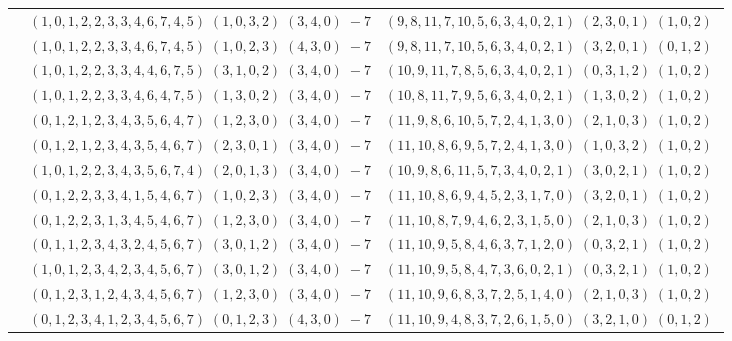 \documentclass[11pt]{article}
\begin{document}
\begin{longtable}[l]{|c|c|c|}
 \cline{2-3} 
 & $(1 ,0 ,1 ,2 ,2 ,3 ,3 ,4 ,6 ,7 ,4 ,5) \;(1 ,0 ,3 ,2) \;(3 ,4 ,0) \;-7$ & $(9 ,8 ,11 ,7 ,10 ,5 ,6 ,3 ,4 ,0 ,2 ,1) \;(2 ,3 ,0 ,1) \;(1 ,0 ,2) \;$\\ 
 \cline{2-3} 
 & $(1 ,0 ,1 ,2 ,2 ,3 ,3 ,4 ,6 ,7 ,4 ,5) \;(1 ,0 ,2 ,3) \;(4 ,3 ,0) \;-7$ & $(9 ,8 ,11 ,7 ,10 ,5 ,6 ,3 ,4 ,0 ,2 ,1) \;(3 ,2 ,0 ,1) \;(0 ,1 ,2) \;$\\ 
 \cline{2-3} 
 & $(1 ,0 ,1 ,2 ,2 ,3 ,3 ,4 ,4 ,6 ,7 ,5) \;(3 ,1 ,0 ,2) \;(3 ,4 ,0) \;-7$ & $(10 ,9 ,11 ,7 ,8 ,5 ,6 ,3 ,4 ,0 ,2 ,1) \;(0 ,3 ,1 ,2) \;(1 ,0 ,2) \;$\\ 
 \cline{2-3} 
 & $(1 ,0 ,1 ,2 ,2 ,3 ,3 ,4 ,6 ,4 ,7 ,5) \;(1 ,3 ,0 ,2) \;(3 ,4 ,0) \;-7$ & $(10 ,8 ,11 ,7 ,9 ,5 ,6 ,3 ,4 ,0 ,2 ,1) \;(1 ,3 ,0 ,2) \;(1 ,0 ,2) \;$\\ 
 \cline{2-3} 
 & $(0 ,1 ,2 ,1 ,2 ,3 ,4 ,3 ,5 ,6 ,4 ,7) \;(1 ,2 ,3 ,0) \;(3 ,4 ,0) \;-7$ & $(11 ,9 ,8 ,6 ,10 ,5 ,7 ,2 ,4 ,1 ,3 ,0) \;(2 ,1 ,0 ,3) \;(1 ,0 ,2) \;$\\ 
 \cline{2-3} 
 & $(0 ,1 ,2 ,1 ,2 ,3 ,4 ,3 ,5 ,4 ,6 ,7) \;(2 ,3 ,0 ,1) \;(3 ,4 ,0) \;-7$ & $(11 ,10 ,8 ,6 ,9 ,5 ,7 ,2 ,4 ,1 ,3 ,0) \;(1 ,0 ,3 ,2) \;(1 ,0 ,2) \;$\\ 
 \cline{2-3} 
 & $(1 ,0 ,1 ,2 ,2 ,3 ,4 ,3 ,5 ,6 ,7 ,4) \;(2 ,0 ,1 ,3) \;(3 ,4 ,0) \;-7$ & $(10 ,9 ,8 ,6 ,11 ,5 ,7 ,3 ,4 ,0 ,2 ,1) \;(3 ,0 ,2 ,1) \;(1 ,0 ,2) \;$\\ 
 \cline{2-3} 
 & $(0 ,1 ,2 ,2 ,3 ,3 ,4 ,1 ,5 ,4 ,6 ,7) \;(1 ,0 ,2 ,3) \;(3 ,4 ,0) \;-7$ & $(11 ,10 ,8 ,6 ,9 ,4 ,5 ,2 ,3 ,1 ,7 ,0) \;(3 ,2 ,0 ,1) \;(1 ,0 ,2) \;$\\ 
 \cline{2-3} 
 & $(0 ,1 ,2 ,2 ,3 ,1 ,3 ,4 ,5 ,4 ,6 ,7) \;(1 ,2 ,3 ,0) \;(3 ,4 ,0) \;-7$ & $(11 ,10 ,8 ,7 ,9 ,4 ,6 ,2 ,3 ,1 ,5 ,0) \;(2 ,1 ,0 ,3) \;(1 ,0 ,2) \;$\\ 
 \cline{2-3} 
 & $(0 ,1 ,1 ,2 ,3 ,4 ,3 ,2 ,4 ,5 ,6 ,7) \;(3 ,0 ,1 ,2) \;(3 ,4 ,0) \;-7$ & $(11 ,10 ,9 ,5 ,8 ,4 ,6 ,3 ,7 ,1 ,2 ,0) \;(0 ,3 ,2 ,1) \;(1 ,0 ,2) \;$\\ 
 \cline{2-3} 
 & $(1 ,0 ,1 ,2 ,3 ,4 ,2 ,3 ,4 ,5 ,6 ,7) \;(3 ,0 ,1 ,2) \;(3 ,4 ,0) \;-7$ & $(11 ,10 ,9 ,5 ,8 ,4 ,7 ,3 ,6 ,0 ,2 ,1) \;(0 ,3 ,2 ,1) \;(1 ,0 ,2) \;$\\ 
 \cline{2-3} 
 & $(0 ,1 ,2 ,3 ,1 ,2 ,4 ,3 ,4 ,5 ,6 ,7) \;(1 ,2 ,3 ,0) \;(3 ,4 ,0) \;-7$ & $(11 ,10 ,9 ,6 ,8 ,3 ,7 ,2 ,5 ,1 ,4 ,0) \;(2 ,1 ,0 ,3) \;(1 ,0 ,2) \;$\\ 
 \cline{2-3} 
 & $(0 ,1 ,2 ,3 ,4 ,1 ,2 ,3 ,4 ,5 ,6 ,7) \;(0 ,1 ,2 ,3) \;(4 ,3 ,0) \;-7$ & $(11 ,10 ,9 ,4 ,8 ,3 ,7 ,2 ,6 ,1 ,5 ,0) \;(3 ,2 ,1 ,0) \;(0 ,1 ,2) \;$\\ 

\end{longtable}
\end{document}
